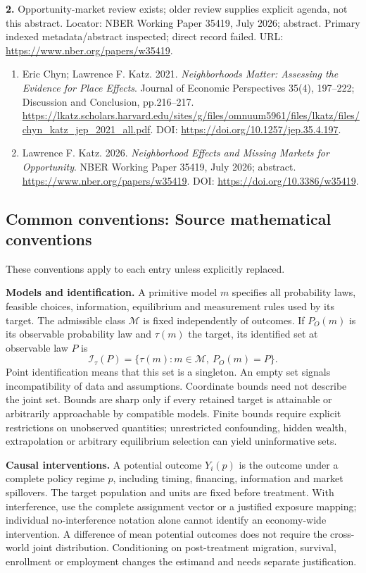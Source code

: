 \documentclass[11pt,a4paper]{article}
\begin{document}
\textbf{2.} Opportunity-market review exists; older review supplies explicit agenda, not this abstract. Locator: NBER Working Paper 35419, July 2026; abstract. Primary indexed metadata/abstract inspected; direct record failed. URL: \url{https://www.nber.org/papers/w35419}.
\begin{enumerate}\raggedright
\item\hypertarget{definitions:source:30007748:1}{} Eric Chyn; Lawrence F. Katz. 2021. \emph{Neighborhoods Matter: Assessing the Evidence for Place Effects}. Journal of Economic Perspectives 35(4), 197–222; Discussion and Conclusion, pp.216–217.
\url{https://lkatz.scholars.harvard.edu/sites/g/files/omnuum5961/files/lkatz/files/chyn_katz_jep_2021_all.pdf}.
DOI: \url{https://doi.org/10.1257/jep.35.4.197}.
\item\hypertarget{definitions:source:30007748:2}{} Lawrence F. Katz. 2026. \emph{Neighborhood Effects and Missing Markets for Opportunity}. NBER Working Paper 35419, July 2026; abstract.
\url{https://www.nber.org/papers/w35419}.
DOI: \url{https://doi.org/10.3386/w35419}.
\end{enumerate}

\subsection*{Common conventions: Source mathematical conventions}

These conventions apply to each entry unless explicitly replaced.

\textbf{Models and identification.} A primitive model \(m\) specifies all probability laws, feasible choices, information, equilibrium and measurement rules used by its target. The admissible class \(\mathcal M\) is fixed independently of outcomes. If \(P_O(m)\) is its observable probability law and \(\tau(m)\) the target, its identified set at observable law \(P\) is
\[
 \mathcal I_\tau(P)=\{\tau(m):m\in\mathcal M,\ P_O(m)=P\}.
\]
Point identification means that this set is a singleton. An empty set signals incompatibility of data and assumptions. Coordinate bounds need not describe the joint set. Bounds are sharp only if every retained target is attainable or arbitrarily approachable by compatible models. Finite bounds require explicit restrictions on unobserved quantities; unrestricted confounding, hidden wealth, extrapolation or arbitrary equilibrium selection can yield uninformative sets.

\textbf{Causal interventions.} A potential outcome \(Y_i(p)\) is the outcome under a complete policy regime \(p\), including timing, financing, information and market spillovers. The target population and units are fixed before treatment. With interference, use the complete assignment vector or a justified exposure mapping; individual no-interference notation alone cannot identify an economy-wide intervention. A difference of mean potential outcomes does not require the cross-world joint distribution. Conditioning on post-treatment migration, survival, enrollment or employment changes the estimand and needs separate justification.
\end{document}
